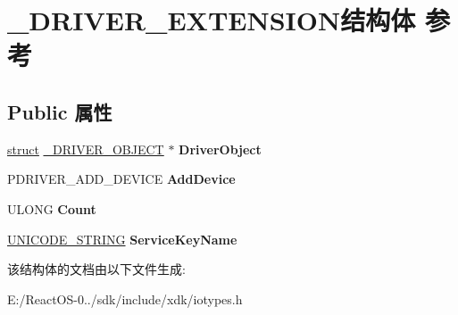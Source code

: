 \hypertarget{struct___d_r_i_v_e_r___e_x_t_e_n_s_i_o_n}{}\section{\+\_\+\+D\+R\+I\+V\+E\+R\+\_\+\+E\+X\+T\+E\+N\+S\+I\+O\+N结构体 参考}
\label{struct___d_r_i_v_e_r___e_x_t_e_n_s_i_o_n}
\subsection*{Public 属性}
\begin{DoxyCompactItemize}
\item 
\mbox{\label{struct___d_r_i_v_e_r___e_x_t_e_n_s_i_o_n_a65f6fe4eb8f99cb9c26c9fc38ad71d03}} 
\hyperlink{interfacestruct}{struct} \hyperlink{struct___d_r_i_v_e_r___o_b_j_e_c_t}{\+\_\+\+D\+R\+I\+V\+E\+R\+\_\+\+O\+B\+J\+E\+CT} $\ast$ {\bfseries Driver\+Object}
\item 
\mbox{\label{struct___d_r_i_v_e_r___e_x_t_e_n_s_i_o_n_a0f6b82f06aa3b8c2c811ab46a85d7557}} 
P\+D\+R\+I\+V\+E\+R\+\_\+\+A\+D\+D\+\_\+\+D\+E\+V\+I\+CE {\bfseries Add\+Device}
\item 
\mbox{\label{struct___d_r_i_v_e_r___e_x_t_e_n_s_i_o_n_ad538c293521ec3d6b4fb739d271fde1d}} 
U\+L\+O\+NG {\bfseries Count}
\item 
\mbox{\label{struct___d_r_i_v_e_r___e_x_t_e_n_s_i_o_n_aa3a6f76b67b89a18d60f16a980b1515f}} 
\hyperlink{struct___u_n_i_c_o_d_e___s_t_r_i_n_g}{U\+N\+I\+C\+O\+D\+E\+\_\+\+S\+T\+R\+I\+NG} {\bfseries Service\+Key\+Name}
\end{DoxyCompactItemize}


该结构体的文档由以下文件生成\+:\begin{DoxyCompactItemize}
\item 
E\+:/\+React\+O\+S-\/0../sdk/include/xdk/iotypes.\+h\end{DoxyCompactItemize}
